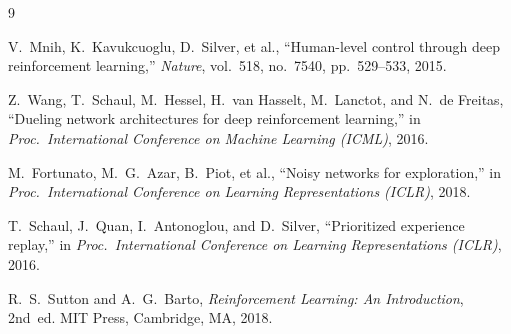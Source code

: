 \documentclass[11pt]{article}
\begin{document}
\begin{thebibliography}{9}

V.~Mnih, K.~Kavukcuoglu, D.~Silver, et al.,
``Human-level control through deep reinforcement learning,''
\emph{Nature}, vol.~518, no.~7540, pp.~529--533, 2015.

Z.~Wang, T.~Schaul, M.~Hessel, H.~van Hasselt, M.~Lanctot, and N.~de
Freitas,
``Dueling network architectures for deep reinforcement learning,''
in \emph{Proc.\ International Conference on Machine Learning (ICML)},
2016.

M.~Fortunato, M.~G.~Azar, B.~Piot, et al.,
``Noisy networks for exploration,''
in \emph{Proc.\ International Conference on Learning Representations
(ICLR)}, 2018.

T.~Schaul, J.~Quan, I.~Antonoglou, and D.~Silver,
``Prioritized experience replay,''
in \emph{Proc.\ International Conference on Learning Representations
(ICLR)}, 2016.

R.~S.~Sutton and A.~G.~Barto,
\emph{Reinforcement Learning: An Introduction}, 2nd~ed.
MIT Press, Cambridge, MA, 2018.

\end{thebibliography}
\end{document}
